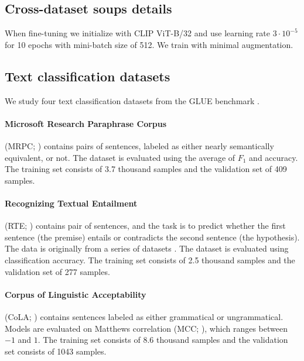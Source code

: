 \documentclass[nohyperref]{article}
\theoremstyle{plain}
\theoremstyle{definition}
\theoremstyle{remark}
\begin{document}
    \subsection{Cross-dataset soups details}\label{app:crossdataset}
    When fine-tuning we initialize with CLIP ViT-B/32 and use learning rate $3\cdot 10^{-5}$ for 10 epochs with mini-batch size of 512.
    We train with minimal augmentation.
    
    \subsection{Text classification datasets}
    \label{app:nlp_datasets}
    
    We study four text classification datasets from the GLUE benchmark \cite{wang2018glue}.
    
    \paragraph{Microsoft Research Paraphrase Corpus} (MRPC; \cite{dolan2005automatically}) contains pairs of sentences, labeled as either nearly semantically equivalent, or not. The dataset is evaluated using the average of $F_1$ and accuracy. The training set consists of 3.7 thousand samples and the validation set of 409 samples.
    
    \paragraph{Recognizing Textual Entailment} (RTE;   \cite{wang2018glue}) contains pair of sentences, and the task is to predict whether the first sentence (the premise) entails or contradicts the second sentence (the hypothesis). The data  is originally from a series of datasets \cite{dagan2005pascal, bar2006second, giampiccolo2007third, bentivogli2009fifth}. The dataset is evaluated using classification accuracy. The training set consists of 2.5 thousand samples and the validation set of 277 samples.
    
    \paragraph{Corpus of Linguistic Acceptability} (CoLA;
     \cite{warstadt2018neural}) contains sentences labeled as either grammatical or ungrammatical. Models are evaluated on Matthews correlation (MCC; \cite{matthews1975comparison}), which ranges between $-1$ and $1$. The training set consists of 8.6 thousand samples and the validation set consists of 1043 samples.
     
\end{document}
